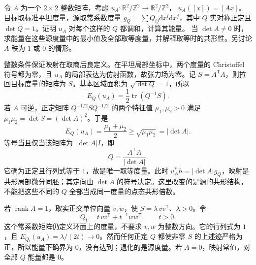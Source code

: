 \begin{exercise}\label{g3:ex:flat-torus-energy-metric}
	令 \(A\) 为一个 \(2\times2\) 整数矩阵，考虑
	\(u_A:\mathbb R^2/\mathbb Z^2\to\mathbb R^2/\mathbb Z^2\)，
	\(u_A([x])=[Ax]\)。目标取标准平坦度量，源取常系数度量
	\(g_Q=\sum Q_{ij}\mathrm dx^i\mathrm dx^j\)，其中 \(Q\) 实对称正定且
	\(\det Q=1\)。证明 \(u_A\) 对每个这样的 \(Q\) 都调和，计算其能量。
	当 \(\det A\ne0\) 时，求能量在这些源度量中的最小值及全部取等度量，并解释取等时的共形性。另讨论 \(A\) 秩为 \(1\) 或 \(0\) 的情形。
\end{exercise}
\begin{solution}
	整数条件保证映射在取商后良定义。在平坦局部坐标中，两个度量的 Christoffel 符号都为零，且 \(u_A\) 的局部表达为仿射函数，故张力场为零。记 \(S=A^{\mathsf T}A\)，则拉回目标度量的矩阵为 \(S\)。基本区域面积为 \(\sqrt{\det Q}=1\)，所以
	\[
		E_Q(u_A)=\frac12\operatorname{tr}(Q^{-1}S).
	\]
	若 \(A\) 可逆，正定矩阵 \(Q^{-1/2}SQ^{-1/2}\) 的两个特征值
	\(\mu_1,\mu_2>0\) 满足 \(\mu_1\mu_2=\det S=(\det A)^2\)。于是
	\[
		E_Q(u_A)=\frac{\mu_1+\mu_2}{2}
		\ge\sqrt{\mu_1\mu_2}=|\det A|.
	\]
	等号当且仅当该矩阵为 \(|\det A|I\)，即
	\[
		Q=\frac{A^{\mathsf T}A}{|\det A|}.
	\]
	它确为正定且行列式等于 \(1\)，故是唯一取等度量。此时
	\(u_A^*h=|\det A|g_Q\)，映射是共形局部微分同胚；其定向由
	\(\det A\) 的符号决定。这里改变的是源的共形结构，不能把这些不同的 \(Q\) 全部当成同一度量的点态共形倍数。

	若 \(\operatorname{rank}A=1\)，取实正交单位向量 \(v,w\)，使
	\(S=\lambda\,vv^{\mathsf T}\)、\(\lambda>0\)。令
	\[
		Q_t=t\,vv^{\mathsf T}+t^{-1}ww^{\mathsf T},\qquad t>0.
	\]
	这个常系数矩阵仍定义环面上的度量，不要求 \(v,w\) 为整数方向。它的行列式为 \(1\)，且
	\(E_{Q_t}(u_A)=\lambda/(2t)\to0\)。然而任何正定 \(Q\) 都使非零
	\(S\) 的上述迹严格为正，所以能量下确界为 \(0\)，没有达到；退化的是源度量。若 \(A=0\)，映射常值，对全部 \(Q\) 能量都是 \(0\)。
\end{solution}

